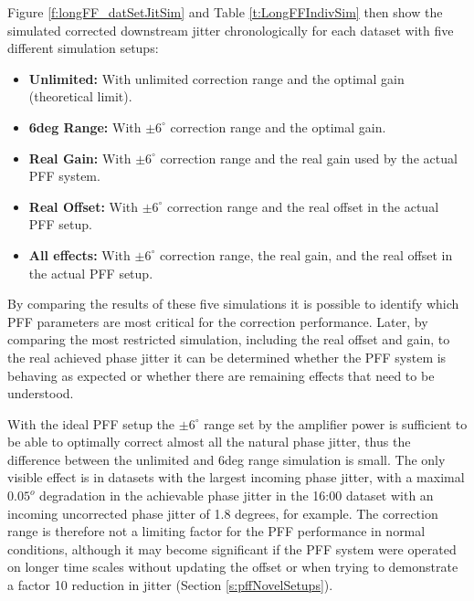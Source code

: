 Figure \ref{f:longFF_datSetJitSim} and Table \ref{t:LongFFIndivSim} then show the simulated corrected downstream jitter chronologically for each dataset with five different simulation setups:
\begin{itemize}
\item \textbf{Unlimited:} With unlimited correction range and the optimal gain (theoretical limit).
\item \textbf{6deg Range:} With \(\pm6^\circ\) correction range and the optimal gain.
\item \textbf{Real Gain:} With \(\pm6^\circ\) correction range and the real gain used by the actual PFF system.
\item \textbf{Real Offset:} With \(\pm6^\circ\) correction range and the real offset in the actual PFF setup.
\item \textbf{All effects:} With \(\pm6^\circ\) correction range, the real gain, and the real offset in the actual PFF setup.
\end{itemize}

By comparing the results of these five simulations it is possible to identify which PFF parameters are most critical for the correction performance. Later, by comparing the most restricted simulation, including the real offset and gain, to the real achieved phase jitter it can be determined whether the PFF system is behaving as expected or whether there are remaining effects that need to be understood.

With the ideal PFF setup the \(\pm6^\circ\) range set by the amplifier power is sufficient to be able to optimally correct almost all the natural phase jitter, thus the difference between the unlimited and 6deg range simulation is small. The only visible effect is in datasets with the largest incoming phase jitter, with a maximal \(0.05^o\) degradation in the achievable phase jitter in the 16:00 dataset with an incoming uncorrected phase jitter of 1.8 degrees, for example. The correction range is therefore not a limiting factor for the PFF performance in normal conditions, although it may become significant if the PFF system were operated on longer time scales without updating the offset or when trying to demonstrate a factor 10 reduction in jitter (Section \ref{s:pffNovelSetups}).

